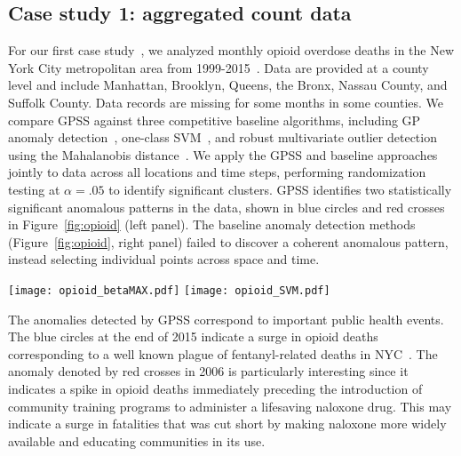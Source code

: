 \documentclass{acm_proc_article-sp}
\begin{document}
\subsection{Case study 1: aggregated count data}

For our first case study~\cite{herlands2017}, we analyzed monthly opioid overdose deaths in the New York City metropolitan area from 1999-2015~\cite{CDCWONDER}. Data are provided at a 
county level and include Manhattan, Brooklyn, Queens, the Bronx, Nassau County, and Suffolk County. Data records are missing for some months in some counties.  We compare GPSS against three competitive baseline algorithms, including GP anomaly detection~\cite{kowalska2012maritime,stegle2008gaussian}, one-class 
SVM~\cite{scholkopf2001estimating}, and robust multivariate outlier detection using the Mahalanobis distance~\cite{rousseeuw2005robust,rousseeuw1990unmasking}. We 
apply the GPSS and baseline approaches jointly to data across all locations and time steps, performing randomization testing at $\alpha=.05$ to identify significant clusters.  GPSS identifies two statistically significant anomalous patterns in the data, shown in blue circles and red crosses in 
Figure~\ref{fig:opioid} (left panel). The baseline anomaly detection methods (Figure~\ref{fig:opioid}, right panel) failed to discover a coherent anomalous pattern, instead selecting individual points across space and 
time.

\begin{figure*}[t]
\begin{center}
\texttt{[image: opioid\_betaMAX.pdf]}
\texttt{[image: opioid\_SVM.pdf]}
\caption{Monthly opioid overdose deaths in the NYC metropolitan area from 1999-2015.  In the left panel, the two statistically significant anomalies detected by GPSS are depicted as red crosses and blue circles.  The right panel shows significant anomalies detected by the one-class SVM.}
\label{fig:opioid}
\end{center}
\end{figure*}

The anomalies detected by GPSS correspond to important public health events. The blue circles at the end of 2015 indicate a surge in opioid deaths corresponding to a 
well known plague of fentanyl-related deaths in NYC~\cite{HealingNYC}. The anomaly denoted by red crosses in 2006 is particularly interesting since it indicates a 
spike in opioid deaths immediately preceding the introduction of community training programs to administer a lifesaving naloxone drug. This may indicate a surge in 
fatalities that was cut short by making naloxone more widely available and educating communities in its use.
\end{document}
